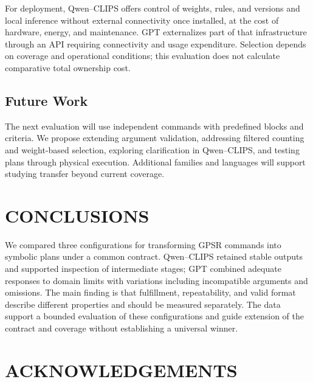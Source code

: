 \documentclass[a4paper,twoside]{article}
\begin{document}
For deployment, Qwen--CLIPS offers control of weights, rules, and versions and local inference without external connectivity once installed, at the cost of hardware, energy, and maintenance. GPT externalizes part of that infrastructure through an API requiring connectivity and usage expenditure. Selection depends on coverage and operational conditions; this evaluation does not calculate comparative total ownership cost.

\subsection{Future Work}
The next evaluation will use independent commands with predefined blocks and criteria. We propose extending argument validation, addressing filtered counting and weight-based selection, exploring clarification in Qwen--CLIPS, and testing plans through physical execution. Additional families and languages will support studying transfer beyond current coverage.

\section{CONCLUSIONS}
We compared three configurations for transforming GPSR commands into symbolic plans under a common contract. Qwen--CLIPS retained stable outputs and supported inspection of intermediate stages; GPT combined adequate responses to domain limits with variations including incompatible arguments and omissions. The main finding is that fulfillment, repeatability, and valid format describe different properties and should be measured separately. The data support a bounded evaluation of these configurations and guide extension of the contract and coverage without establishing a universal winner.



\section*{ACKNOWLEDGEMENTS}



\end{document}
